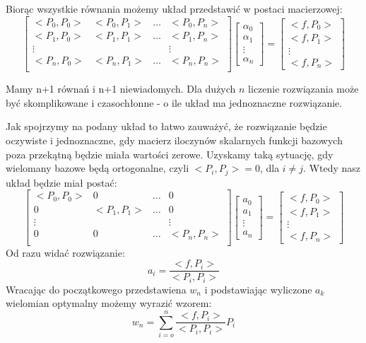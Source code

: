 \documentclass[11pt]{article}
\begin{document}
Biorąc wszystkie równania możemy układ przedstawić w postaci macierzowej:
\begin{equation}
\begin{bmatrix}
<P_0,P_0> & <P_0,P_1> & \hdots & <P_0,P_n>\\
<P_1,P_0> & <P_1,P_1> & \hdots & <P_1,P_n>\\
\vdots &  &  & \vdots\\
<P_n,P_0> & <P_n,P_1> & \hdots & <P_n,P_n>\\
\end{bmatrix}
\begin{bmatrix}
\alpha_0 \\
\alpha_1 \\
\vdots \\
\alpha_n
\end{bmatrix} = 
\begin{bmatrix}
<f,P_0>\\
<f,P_1>\\
\vdots \\
<f,P_n>
\end{bmatrix}
\end{equation}

Mamy n+1 równań i n+1 niewiadomych. Dla dużych $n$ liczenie rozwiązania może być skomplikowane i czasochłonne - o ile układ ma jednoznaczne rozwiązanie.
  
Jak spojrzymy na podany układ to łatwo zauważyć, że rozwiązanie będzie oczywiste i jednoznaczne, gdy macierz iloczynów skalarnych funkcji bazowych poza przekątną będzie miała wartości zerowe. Uzyskamy taką sytuację, gdy wielomany bazowe będą ortogonalne, czyli $<P_i, P_j> = 0$, dla $i \neq j $. Wtedy nasz układ będzie miał postać:
\begin{equation}
\begin{bmatrix}
<P_0,P_0> & 0 & \hdots & 0\\
0 & <P_1,P_1> & \hdots & 0\\
\vdots &  &  & \vdots\\
0 & 0 & \hdots & <P_n,P_n>\\
\end{bmatrix}
\begin{bmatrix}
a_0 \\
a_1 \\
\vdots \\
a_n
\end{bmatrix} = 
\begin{bmatrix}
<f,P_0>\\
<f,P_1>\\
\vdots \\
<f,P_n>
\end{bmatrix}
\end{equation}
Od razu widać rozwiązanie: 
\begin{equation*}
a_i = \frac{<f,P_i>}{<P_i,P_i>}
\end{equation*}
Wracając do początkowego przedstawiena $w_n$ i podstawiając wyliczone $a_k$ wielomian optymalny możemy wyrazić wzorem:
\begin{equation*}
w_n = \sum_{i = o}^n \frac{<f,P_i>}{<P_i,P_i>} P_i
\end{equation*}
\end{document}
